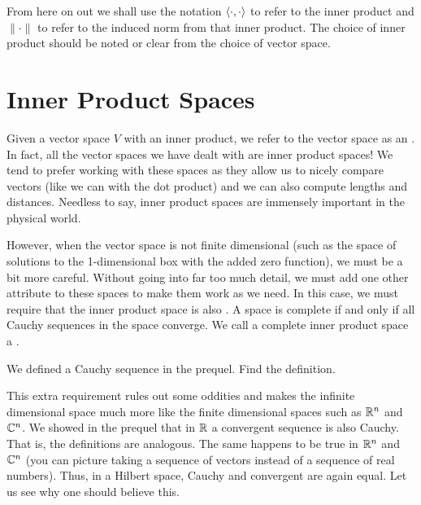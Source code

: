\begin{remark}
	From here on out we shall use the notation $\left\langle \cdot, \cdot \right\rangle$ to refer to the inner product and $\|\cdot\|$ to refer to the induced norm from that inner product.  The choice of inner product should be noted or clear from the choice of vector space.
\end{remark}

	\section{Inner Product Spaces}

Given a vector space $V$ with an inner product, we refer to the vector space as an .  In fact, all the vector spaces we have dealt with are inner product spaces! We tend to prefer working with these spaces as they allow us to nicely compare vectors (like we can with the dot product) and we can also compute lengths and distances.  Needless to say, inner product spaces are immensely important in the physical world.

However, when the vector space is not finite dimensional (such as the space of solutions to the 1-dimensional box with the added zero function), we must be a bit more careful.  Without going into far too much detail, we must add one other attribute to these spaces to make them work as we need.  In this case, we must require that the inner product space is also .  A space is complete if and only if all Cauchy sequences in the space converge. We call a complete inner product space a .

\begin{exercise}
	We defined a Cauchy sequence in the prequel. Find the definition.
\end{exercise}

This extra requirement rules out some oddities and makes the infinite dimensional space much more like the finite dimensional spaces such as $\mathbb{R}^n$ and $\mathbb{C}^n$.  We showed in the prequel that in $\mathbb{R}$ a convergent sequence is also Cauchy. That is, the definitions are analogous. The same happens to be true in $\mathbb{R}^n$ and $\mathbb{C}^n$ (you can picture taking a sequence of vectors instead of a sequence of real numbers).  Thus, in a Hilbert space, Cauchy and convergent are again equal. Let us see why one should believe this.

